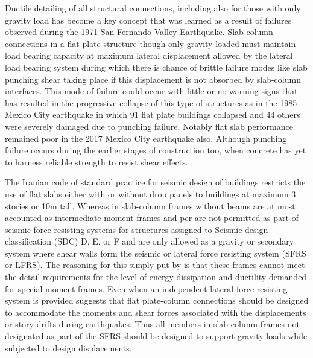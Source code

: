 \documentclass[twocolumn]{article} %
\begin{document}
Ductile detailing of all structural connections, including also for those with only gravity load has become a key concept that was learned as a result of failures observed during the 1971 San Fernando Valley Earthquake. Slab-column connections in a flat plate structure though only gravity loaded must maintain load bearing capacity at maximum lateral displacement allowed by the lateral load bearing system during which there is chance of brittle failure modes like slab punching shear taking place if this displacement is not absorbed by slab-column interfaces\citep{DoD2016}. This mode of failure could occur with little or no warning signs that has resulted in the progressive collapse of this type of structures as in the 1985 Mexico City earthquake in which 91 flat plate buildings collapsed and 44 others were severely damaged due to punching failure\citep{ghali2000stud}. Notably flat slab performance remained poor in the 2017 Mexico City earthquake also\citep{insufi2020}. Although punching failure occurs during the earlier stages of construction too, when concrete has yet to harness reliable strength to resist shear effects\citep{gardner2011}. 


The Iranian code of standard practice for seismic design of buildings\citep[Section 3-3-5-5]{28002014} restricts the use of flat slabs either with or without drop panels to buildings at maximum 3 stories or 10m tall. Whereas in \cite{aci31819} slab-column frames without beams are at most accounted as intermediate moment frames and per \citet[Section R18.2]{aci31819} are not permitted as part of seismic-force-resisting systems for structures assigned to Seismic design classification (SDC) D, E, or F and are only allowed as a gravity or secondary system where shear walls form the seismic or lateral force resisting system (SFRS or LFRS). The reasoning for this simply put by \citet[Chapter 7]{JointACI-ASCECommittee4212015} is that these frames cannot meet the detail requirements for the level of energy dissipation and ductility demanded for special moment frames. Even when an independent lateral-force-resisting system is provided \cite{JointACI-ASCECommittee4212015} suggests that flat plate-column connections should be designed to accommodate the moments and shear forces associated with the displacements or story drifts during earthquakes. Thus all members in slab-column frames not designated as part of the SFRS should be designed to support gravity loads while subjected to design displacements.  
\end{document}
